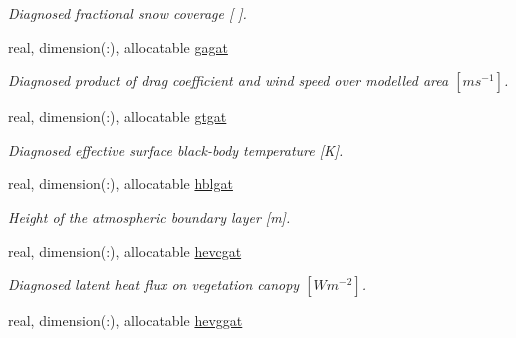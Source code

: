 \begin{DoxyCompactItemize}
\begin{DoxyCompactList}\small\item\em Diagnosed fractional snow coverage \mbox{[} \mbox{]}. \end{DoxyCompactList}\item 
\hypertarget{structclass__statevars_1_1class__gather_a017ac21c488f3b17645e4836b335bbc1}{}real, dimension(\+:), allocatable \hyperlink{structclass__statevars_1_1class__gather_a017ac21c488f3b17645e4836b335bbc1}{gagat}\label{structclass__statevars_1_1class__gather_a017ac21c488f3b17645e4836b335bbc1}

\begin{DoxyCompactList}\small\item\em Diagnosed product of drag coefficient and wind speed over modelled area $[m s^{-1} ]$. \end{DoxyCompactList}\item 
\hypertarget{structclass__statevars_1_1class__gather_ae9f0a0a5fe937fab3825efd64a4ec5d2}{}real, dimension(\+:), allocatable \hyperlink{structclass__statevars_1_1class__gather_ae9f0a0a5fe937fab3825efd64a4ec5d2}{gtgat}\label{structclass__statevars_1_1class__gather_ae9f0a0a5fe937fab3825efd64a4ec5d2}

\begin{DoxyCompactList}\small\item\em Diagnosed effective surface black-\/body temperature \mbox{[}K\mbox{]}. \end{DoxyCompactList}\item 
\hypertarget{structclass__statevars_1_1class__gather_ac5fba0bc674584cfca393b95d0278433}{}real, dimension(\+:), allocatable \hyperlink{structclass__statevars_1_1class__gather_ac5fba0bc674584cfca393b95d0278433}{hblgat}\label{structclass__statevars_1_1class__gather_ac5fba0bc674584cfca393b95d0278433}

\begin{DoxyCompactList}\small\item\em Height of the atmospheric boundary layer \mbox{[}m\mbox{]}. \end{DoxyCompactList}\item 
\hypertarget{structclass__statevars_1_1class__gather_a7938f058fb55e629d28d1d14c271dc58}{}real, dimension(\+:), allocatable \hyperlink{structclass__statevars_1_1class__gather_a7938f058fb55e629d28d1d14c271dc58}{hevcgat}\label{structclass__statevars_1_1class__gather_a7938f058fb55e629d28d1d14c271dc58}

\begin{DoxyCompactList}\small\item\em Diagnosed latent heat flux on vegetation canopy $[W m^{-2} ]$. \end{DoxyCompactList}\item 
\hypertarget{structclass__statevars_1_1class__gather_a7c945a5db82a2ff2da066c0ae3971b06}{}real, dimension(\+:), allocatable \hyperlink{structclass__statevars_1_1class__gather_a7c945a5db82a2ff2da066c0ae3971b06}{hevggat}\label{structclass__statevars_1_1class__gather_a7c945a5db82a2ff2da066c0ae3971b06}


\end{DoxyCompactItemize}
